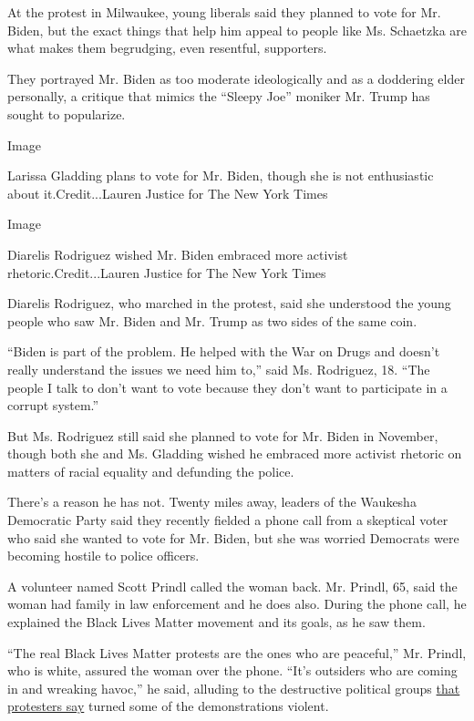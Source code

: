 At the protest in Milwaukee, young liberals said they planned to vote
for Mr. Biden, but the exact things that help him appeal to people like
Ms. Schaetzka are what makes them begrudging, even resentful,
supporters.

They portrayed Mr. Biden as too moderate ideologically and as a
doddering elder personally, a critique that mimics the ``Sleepy Joe''
moniker Mr. Trump has sought to popularize.

Image

Larissa Gladding plans to vote for Mr. Biden, though she is not
enthusiastic about it.Credit...Lauren Justice for The New York Times

Image

Diarelis Rodriguez wished Mr. Biden embraced more activist
rhetoric.Credit...Lauren Justice for The New York Times

Diarelis Rodriguez, who marched in the protest, said she understood the
young people who saw Mr. Biden and Mr. Trump as two sides of the same
coin.

``Biden is part of the problem. He helped with the War on Drugs and
doesn't really understand the issues we need him to,'' said Ms.
Rodriguez, 18. ``The people I talk to don't want to vote because they
don't want to participate in a corrupt system.''

But Ms. Rodriguez still said she planned to vote for Mr. Biden in
November, though both she and Ms. Gladding wished he embraced more
activist rhetoric on matters of racial equality and defunding the
police.

There's a reason he has not. Twenty miles away, leaders of the Waukesha
Democratic Party said they recently fielded a phone call from a
skeptical voter who said she wanted to vote for Mr. Biden, but she was
worried Democrats were becoming hostile to police officers.

A volunteer named Scott Prindl called the woman back. Mr. Prindl, 65,
said the woman had family in law enforcement and he does also. During
the phone call, he explained the Black Lives Matter movement and its
goals, as he saw them.

``The real Black Lives Matter protests are the ones who are peaceful,''
Mr. Prindl, who is white, assured the woman over the phone. ``It's
outsiders who are coming in and wreaking havoc,'' he said, alluding to
the destructive political groups
\href{https://www.nytimes.com/2020/05/31/us/george-floyd-protests-white-supremacists-antifa.html}{that
protesters say} turned some of the demonstrations violent.

